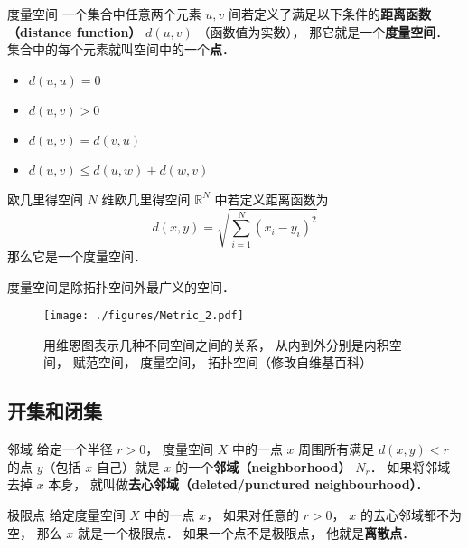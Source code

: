 

\begin{definition}{度量空间}
一个集合中任意两个元素 $u, v$ 间若定义了满足以下条件的\textbf{距离函数（distance function）} $d(u, v)$ （函数值为实数）， 那它就是一个\textbf{度量空间}． 集合中的每个元素就叫空间中的一个\textbf{点}．
\begin{itemize}
\item $d(u, u) = 0$
\item $d(u, v) > 0$
\item $d(u, v) = d(v, u)$
\item $d(u, v) \leqslant d(u, w) + d(w, v)$
\end{itemize}
\end{definition}

\begin{exercise}{欧几里得空间}
$N$ 维欧几里得空间 $\mathbb R^N$ 中若定义距离函数为
\begin{equation}
d(x, y) = \sqrt{\sum_{i=1}^N (x_i - y_i)^2}
\end{equation}
那么它是一个度量空间．
\end{exercise}

度量空间是除拓扑空间外最广义的空间．
\begin{figure}[ht]
\centering
\texttt{[image: ./figures/Metric\_2.pdf]}
\caption{用维恩图表示几种不同空间之间的关系， 从内到外分别是内积空间， 赋范空间， 度量空间， 拓扑空间（修改自维基百科）} \label{Metric_fig2}
\end{figure}

\subsection{开集和闭集}

\begin{definition}{邻域}
给定一个半径 $r > 0$， 度量空间 $X$ 中的一点 $x$ 周围所有满足 $d(x, y) < r$ 的点 $y$（包括 $x$ 自己）就是 $x$ 的一个\textbf{邻域（neighborhood）} $N_r$． 如果将邻域去掉 $x$ 本身， 就叫做\textbf{去心邻域（deleted/punctured neighbourhood）}．
\end{definition}

\begin{definition}{极限点}
给定度量空间 $X$ 中的一点 $x$， 如果对任意的 $r > 0$， $x$ 的去心邻域都不为空， 那么 $x$ 就是一个极限点． 如果一个点不是极限点， 他就是\textbf{离散点}．
\end{definition}

